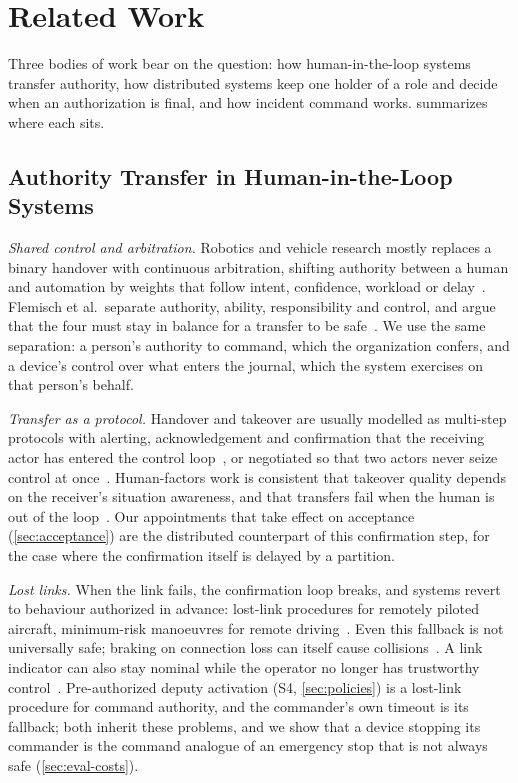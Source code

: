 \section{Related Work}
\label{sec:related}

Three bodies of work bear on the question: how human-in-the-loop systems transfer
authority, how distributed systems keep one holder of a role and decide when an
authorization is final, and how incident command works.  summarizes
where each sits.

\subsection{Authority Transfer in Human-in-the-Loop Systems}
\label{sec:related-hitl}

\textit{Shared control and arbitration.} Robotics and vehicle research mostly replaces a
binary handover with continuous arbitration, shifting authority between a human and
automation by weights that follow intent, confidence, workload or
delay~\cite{abbink2012haptic,abbink2018topology,darvish2023teleoperation}. Flemisch et
al.\ separate authority, ability, responsibility and control, and argue that the four must
stay in balance for a transfer to be safe~\cite{flemisch2012balance}. We use the same
separation: a person's authority to command, which the organization confers, and a
device's control over what enters the journal, which the system exercises on that person's
behalf.

\textit{Transfer as a protocol.} Handover and takeover are usually modelled as multi-step
protocols with alerting, acknowledgement and confirmation that the receiving actor has
entered the control loop~\cite{gil2019designing,gil2020engineering,saito2018transfer},
or negotiated so that two actors never seize control at once~\cite{rothfuss2022negotiation}.
Human-factors work is consistent that takeover quality depends on the receiver's situation
awareness, and that transfers fail when the human is out of the
loop~\cite{endsley2017autonomy,grindley2024handover}. Our appointments that take effect on
acceptance (\cref{sec:acceptance}) are the distributed counterpart of this confirmation
step, for the case where the confirmation itself is delayed by a partition.

\textit{Lost links.} When the link fails, the confirmation loop breaks, and systems revert
to behaviour authorized in advance: lost-link procedures for remotely piloted aircraft,
minimum-risk manoeuvres for remote driving~\cite{reyesmunoz2023rpas,sakakeeny2024lost}.
Even this fallback is not universally safe; braking on connection loss can itself cause
collisions~\cite{brettin2025blindspot}. A link indicator can also stay nominal while the
operator no longer has trustworthy control~\cite{sonaglio2026connectivity}. Pre-authorized
deputy activation (S4, \cref{sec:policies}) is a lost-link procedure for command authority,
and the commander's own timeout is its fallback; both inherit these problems, and we show
that a device stopping its commander is the command analogue of an emergency stop that is
not always safe (\cref{sec:eval-costs}).

